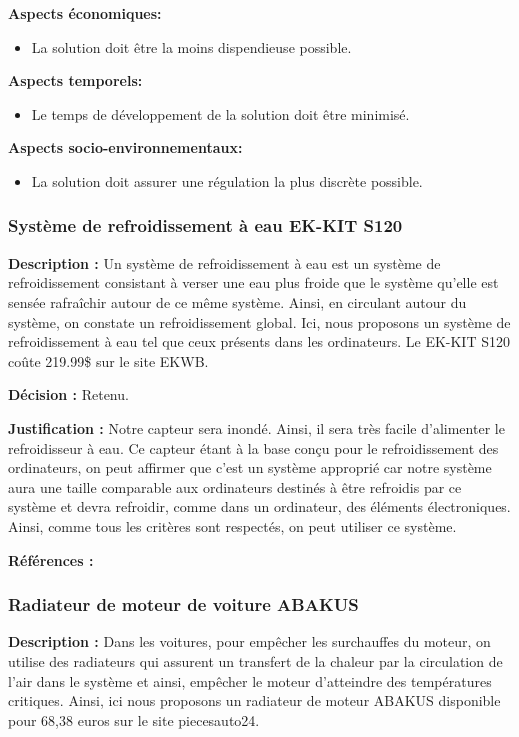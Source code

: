 \textbf{Aspects économiques:}
\begin{itemize}[label = {--}]
    \item La solution doit être la moins dispendieuse possible.
\end{itemize}

\textbf{Aspects temporels:}
\begin{itemize}[label = {--}]
    \item Le temps de développement de la solution doit être minimisé.
\end{itemize}

\textbf{Aspects socio-environnementaux:}
\begin{itemize}[label = {--}]
    \item La solution doit assurer une régulation la plus discrète possible.
\end{itemize}

\subsubsection{Système de refroidissement à eau EK-KIT S120}

\textbf{Description :} Un système de refroidissement à eau est un système de refroidissement consistant à verser une eau plus froide que le système qu'elle est sensée rafraîchir autour de ce même système. Ainsi, en circulant autour du système, on constate un refroidissement global. Ici, nous proposons un système de refroidissement à eau tel que ceux présents dans les ordinateurs. Le EK-KIT S120 coûte 219.99\$ sur le site EKWB.

\textbf{Décision :} Retenu.

\textbf{Justification :} Notre capteur sera inondé. Ainsi, il sera très facile d'alimenter le refroidisseur à eau. Ce capteur étant à la base conçu pour le refroidissement des ordinateurs, on peut affirmer que c'est un système approprié car notre système aura une taille comparable aux ordinateurs destinés à être refroidis par ce système et devra refroidir, comme dans un ordinateur, des éléments électroniques. Ainsi, comme tous les critères sont respectés, on peut utiliser ce système.

\textbf{Références :} \cite{eau1} \cite{eau2}

\subsubsection{Radiateur de moteur de voiture ABAKUS}
\textbf{Description :} Dans les voitures, pour empêcher les surchauffes du moteur, on utilise des radiateurs qui assurent un transfert de la chaleur par la circulation de l'air dans le système et ainsi, empêcher le moteur d'atteindre des températures critiques. Ainsi, ici nous proposons un radiateur de moteur ABAKUS disponible pour 68,38 euros sur le site piecesauto24.

